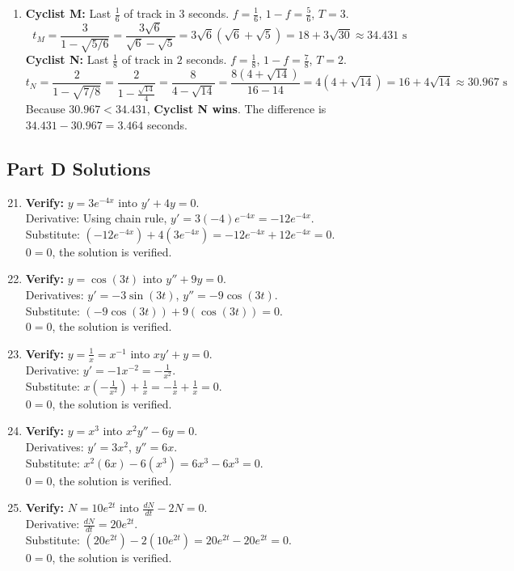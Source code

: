 \documentclass{article}
\begin{document}
\begin{enumerate}
    \item \textbf{Cyclist M:} Last $\frac{1}{6}$ of track in $3$ seconds. $f = \frac{1}{6}$, $1-f = \frac{5}{6}$, $T=3$.
    $$ t_M = \frac{3}{1 - \sqrt{5/6}} = \frac{3\sqrt{6}}{\sqrt{6} - \sqrt{5}} = 3\sqrt{6}(\sqrt{6}+\sqrt{5}) = 18 + 3\sqrt{30} \approx 34.431 \text{ s} $$
    \textbf{Cyclist N:} Last $\frac{1}{8}$ of track in $2$ seconds. $f = \frac{1}{8}$, $1-f = \frac{7}{8}$, $T=2$.
    $$ t_N = \frac{2}{1 - \sqrt{7/8}} = \frac{2}{1 - \frac{\sqrt{14}}{4}} = \frac{8}{4 - \sqrt{14}} = \frac{8(4+\sqrt{14})}{16-14} = 4(4+\sqrt{14}) = 16 + 4\sqrt{14} \approx 30.967 \text{ s} $$
    Because $30.967 < 34.431$, \textbf{Cyclist N wins}. The difference is $34.431 - 30.967 = 3.464$ seconds.
\end{enumerate}

\subsection*{Part D Solutions}
\begin{enumerate}
    \setcounter{enumi}{20}
    \item \textbf{Verify:} $y = 3e^{-4x}$ into $y' + 4y = 0$. \\
    Derivative: Using chain rule, $y' = 3(-4)e^{-4x} = -12e^{-4x}$. \\
    Substitute: $(-12e^{-4x}) + 4(3e^{-4x}) = -12e^{-4x} + 12e^{-4x} = 0$. \\
    $0 = 0$, the solution is verified.
    
    \item \textbf{Verify:} $y = \cos(3t)$ into $y'' + 9y = 0$. \\
    Derivatives: $y' = -3\sin(3t)$, $y'' = -9\cos(3t)$. \\
    Substitute: $(-9\cos(3t)) + 9(\cos(3t)) = 0$. \\
    $0 = 0$, the solution is verified.
    
    \item \textbf{Verify:} $y = \frac{1}{x} = x^{-1}$ into $x y' + y = 0$. \\
    Derivative: $y' = -1x^{-2} = -\frac{1}{x^2}$. \\
    Substitute: $x(-\frac{1}{x^2}) + \frac{1}{x} = -\frac{1}{x} + \frac{1}{x} = 0$. \\
    $0 = 0$, the solution is verified.
    
    \item \textbf{Verify:} $y = x^3$ into $x^2 y'' - 6y = 0$. \\
    Derivatives: $y' = 3x^2$, $y'' = 6x$. \\
    Substitute: $x^2(6x) - 6(x^3) = 6x^3 - 6x^3 = 0$. \\
    $0 = 0$, the solution is verified.
    
    \item \textbf{Verify:} $N = 10e^{2t}$ into $\frac{dN}{dt} - 2N = 0$. \\
    Derivative: $\frac{dN}{dt} = 20e^{2t}$. \\
    Substitute: $(20e^{2t}) - 2(10e^{2t}) = 20e^{2t} - 20e^{2t} = 0$. \\
    $0 = 0$, the solution is verified.
\end{enumerate}
\end{document}
